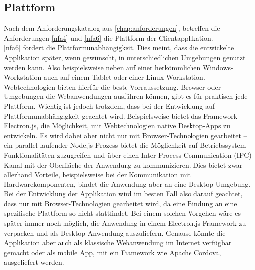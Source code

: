 \subsection{Plattform}
\label{subs:plattform}

Nach dem Anforderungskatalog aus \autoref{chap:anforderungen}, betreffen die Anforderungen
\ref{nfa4} und \ref{nfa6} die Plattform der Clientapplikation.\\

\ref{nfa6} fordert die Plattformunabhängigkeit. Dies meint, dass die entwickelte
Applikation später, wenn gewünscht, in unterschiedlichen Umgebungen genutzt werden kann.
Also beispielsweise neben auf einer herkömmlichen Windows-Workstation auch auf einem
Tablet oder einer Linux-Workstation. Webtechnologien bieten hierfür die beste Vorraussetzung. 
Browser oder Umgebungen die Webanwendungen ausführen können, gibt es für praktisch 
jede Plattform. Wichtig ist jedoch trotzdem, dass bei der Entwicklung auf
Plattformunabhängigkeit geachtet wird. Beispielsweise bietet das Framework Electron.js, die 
Möglichkeit, mit Webtechnologien native Desktop-Apps zu entwickeln. Es wird dabei aber nicht
nur mit Browser-Technologien gearbeitet -- ein parallel laufender Node.js-Prozess bietet
die Möglichkeit auf Betriebssystem-Funktionalitäten zuzugreifen 
und über einen Inter-Process-Communication (IPC) Kanal mit der Oberfläche der Anwendung zu
kommunizieren. Dies bietet zwar allerhand Vorteile, beispielsweise bei der Kommunikation
mit Hardwarekomponenten, bindet die Anwendung aber an eine Desktop-Umgebung. 
Bei der Entwicklung der Applikation wird im besten Fall also darauf geachtet, dass nur mit 
Browser-Technologien gearbeitet wird, da eine Bindung an eine spezifische Plattform so 
nicht stattfindet. Bei einem solchen Vorgehen wäre es später immer noch möglich, 
die Anwendung in einem Electron.js-Framework zu verpacken und als Desktop-Anwendung auszuliefern. 
Genauso könnte die Applikation aber auch als klassische Webanwendung im Internet verfügbar gemacht oder 
als mobile App, mit ein Framework wie Apache Cordova, ausgeliefert werden.\\

